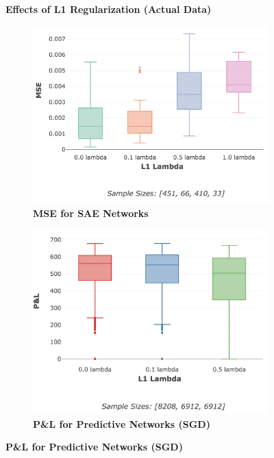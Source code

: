 \documentclass[a4paper,11pt,oneside]{article}
\theoremstyle{plain}
\theoremstyle{definition}
\begin{document}
	
	\begin{figure}[H]
		\centering
		\textbf{Effects of L1 Regularization (Actual Data)}
		\begin{subfigure}{.5\textwidth}
			\centering 
			\includegraphics[scale=0.3]{images/results/network/reg/actual_mse_reg.png}
			\caption{\textbf{MSE for SAE Networks} 
				\newline }
			\label{figure-actual_mse_reg}
		\end{subfigure}%
		\begin{subfigure}{.5\textwidth}
			\centering 
			\includegraphics[scale=0.3]{images/results/network/reg/actual_pl_reg.png}
			\caption{\textbf{P\&L for Predictive Networks (SGD)} 
}
\end{subfigure}
\end{figure}
\end{document}
